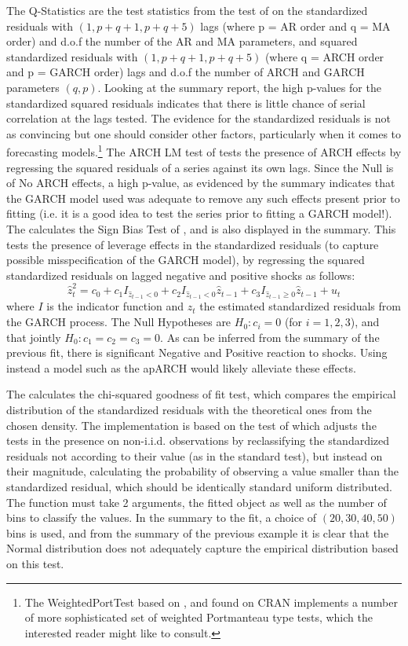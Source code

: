 The Q-Statistics are the test statistics from the test of \cite{Ljung1978} on the
standardized residuals with $(1,p+q+1,p+q+5)$ lags (where p = AR order and q = MA order)
and d.o.f the number of the AR and MA parameters, and squared standardized residuals with
$(1,p+q+1,p+q+5)$ (where q = ARCH order and p = GARCH order) lags and d.o.f the
number of ARCH and GARCH parameters $(q,p)$. Looking at the summary report, the
high p-values for the standardized squared residuals indicates that there is little
chance of serial correlation at the lags tested. The evidence for the standardized
residuals is not as convincing but one should consider other factors, particularly when
it comes to forecasting models.\footnote{The WeightedPortTest based on \cite{Fisher2012},
and found on CRAN implements a number of more sophisticated set of weighted Portmanteau type
tests, which the interested reader might like to consult.}
The ARCH LM test of \cite{Engle1982} tests the presence of ARCH effects by regressing
the squared residuals of a series against its own lags. Since the Null is of No
ARCH effects, a high p-value, as evidenced by the summary indicates that the
GARCH model used was adequate to remove any such effects present prior to
fitting (i.e. it is a good idea to test the series prior to fitting a GARCH model!).
The \verb@signbias@ calculates the Sign Bias Test of \cite{Engle1993}, and is also
displayed in the summary. This tests the presence of leverage effects in the
standardized residuals (to capture possible misspecification of the GARCH model),
by regressing the squared standardized residuals on lagged negative and positive
shocks as follows:
\begin{equation}\label{signbias}
\hat z_t^2 = {c_0} + {c_1}{I_{{{\hat z}_{t - 1}} < 0}} + {c_2}{I_{{{\hat z}_{t - 1}} < 0}}{\hat z_{t - 1}} + {c_3}{I_{{{\hat z}_{t - 1}} \geqslant 0}}{\hat z_{t - 1}} + {u_t}
\end{equation}
where $I$ is the indicator function and $\hat z_t$ the estimated standardized residuals
from the GARCH process. The Null Hypotheses are $H_0:c_i=0$ (for $i=1,2,3$), and that
jointly $H_0:c_1=c_2=c_3=0$. As can be inferred from the summary of the previous
fit, there is significant Negative and Positive reaction to shocks. Using
instead a model such as the apARCH would likely alleviate these effects.

The \verb@gof@ calculates the chi-squared goodness of fit test, which compares
the empirical distribution of the standardized residuals with the theoretical
ones from the chosen density. The implementation is based on the test of
\cite{Palm1996} which adjusts the tests in the presence on non-i.i.d. observations
by reclassifying the standardized residuals not according to their value (as in
the standard test), but instead on their magnitude, calculating the probability
of observing a value smaller than the standardized residual, which should be
identically standard uniform distributed. The function must take 2 arguments, the
fitted object as well as the number of bins to classify the values. In the
summary to the fit, a choice of $(20,30,40,50)$ bins is used, and from the
summary of the previous example it is clear that the Normal distribution does
not adequately capture the empirical distribution based on this test.

